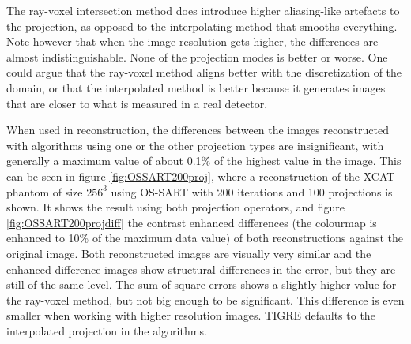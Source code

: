 The ray-voxel intersection method does introduce higher aliasing-like artefacts to the projection, as opposed to the interpolating method that smooths everything. Note however that when the image resolution gets higher, the differences are almost indistinguishable. None of the projection modes is better or worse. One could argue that the ray-voxel method aligns better with the discretization of the domain, or that the interpolated method is better because it generates images that are closer to what is measured in a real detector. 


When used in reconstruction, the differences between the images reconstructed with algorithms using one or the other projection types are insignificant, with generally a maximum value of about 0.1\% of the highest value in the image. This can be seen in figure \ref{fig:OSSART200proj}, where a reconstruction of the XCAT\cite{XCAT} phantom of size $256^3$ using OS-SART with 200 iterations and 100 projections is shown. It shows the result using both projection operators, and figure \ref{fig:OSSART200projdiff} the contrast enhanced differences (the colourmap is enhanced to 10\% of the maximum data value) of both reconstructions against the original image. Both reconstructed images are visually very similar and the enhanced difference images show structural differences in the error, but they are still of the same level. The sum of square errors shows a slightly higher value for the ray-voxel method, but not big enough to be significant. This difference is even smaller when working with higher resolution images. TIGRE defaults to the interpolated projection in the algorithms.



